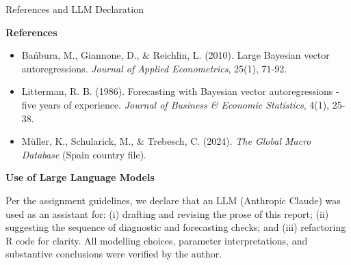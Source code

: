 \documentclass[9pt]{beamer}
\begin{document}
\begin{frame}{References and LLM Declaration}
\scriptsize

\textbf{References}

\begin{itemize}
    \item Bańbura, M., Giannone, D., \& Reichlin, L. (2010). Large Bayesian vector autoregressions. \textit{Journal of Applied Econometrics}, 25(1), 71-92.
    \item Litterman, R. B. (1986). Forecasting with Bayesian vector autoregressions - five years of experience. \textit{Journal of Business \& Economic Statistics}, 4(1), 25-38.
    \item Müller, K., Schularick, M., \& Trebesch, C. (2024). \textit{The Global Macro Database} (Spain country file).
\end{itemize}

\vspace{0.25cm}

\textbf{Use of Large Language Models}

Per the assignment guidelines, we declare that an LLM (Anthropic Claude) was used as an assistant for:
(i) drafting and revising the prose of this report;
(ii) suggesting the sequence of diagnostic and forecasting checks; and
(iii) refactoring R code for clarity. All modelling choices, parameter interpretations, and substantive conclusions were verified by the author.

\end{frame}
\end{document}
